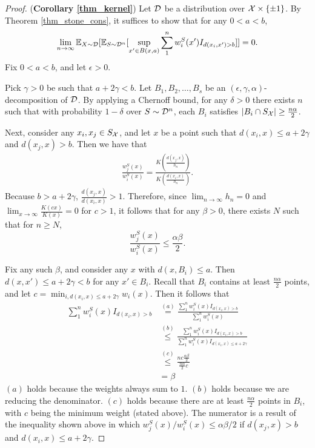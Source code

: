 \begin{proof} (\textbf{Corollary \ref{thm_kernel}})
Let ${\mathcal D}$ be a distribution over $\mathcal X \times \{\pm 1\}$. By Theorem \ref{thm_stone_cons}, it suffices to show that for any $0 < a < b$, $$\lim_{n \to \infty} \mathbb{E}_{X \sim {\mathcal D}}[\mathbb{E}_{S \sim {\mathcal D}^n} [\sup_{x' \in B(x,a)} \sum_1^n w_i^S(x')I_{d(x_i, x') > b}]] = 0.$$ Fix $0 < a < b$, and let $\epsilon > 0$. 

Pick $\gamma > 0$ be such that $a+ 2\gamma < b$. Let $B_1, B_2, \dots, B_s$ be an $(\epsilon, \gamma, \alpha)$-decomposition of ${\mathcal D}$. By applying a Chernoff bound, for any $\delta > 0$ there exists $n$ such that with probability $1-\delta$ over $S \sim {\mathcal D}^n$, each $B_i$ satisfies $|B_i \cap S_\mathcal X| \geq \frac{n\alpha}{2}$.

Next, consider any $x_i, x_j \in S_\mathcal X$, and let $x$ be a point such that $d(x_i, x) \leq a+2\gamma$ and $d(x_j, x) > b$. Then we have that 
\begin{equation*}
\begin{split}
\frac{w_j^S(x)}{w_i^S(x)} = \frac{K(\frac{d(x_j, x)}{h_n})}{K(\frac{d(x_i, x)}{h_n})}.
\end{split}
\end{equation*}
Because $b > a + 2\gamma$, $\frac{d(x_j, x)}{d(x_i, x)} > 1$. Therefore, since $\lim_{n \to \infty} h_n = 0$ and $\lim_{x \to \infty} \frac{K(cx)}{K(x)} = 0$ for $c > 1$, it follows that for any $\beta > 0$, there exists $N$ such that for $n \geq N$, $$\frac{w_j^S(x)}{w_i^S(x)} \leq \frac{\alpha\beta}{2}.$$ 

Fix any such $\beta$, and consider any $x$ with $d(x, B_i) \leq a$. Then $d(x, x') \leq a+ 2\gamma < b$ for any $x' \in B_i$. Recall that $B_i$ contains at least $\frac{n\alpha}{2}$ points, and let $c = \min_{i, d(x_i, x) \leq a + 2\gamma} w_i(x)$. Then it follows that 
\begin{equation*}
\begin{split}
\sum_1^n w_i^S(x)I_{d(x_i, x) > b} &\stackrel{(a)}{=} \frac{\sum_1^n w_i^S(x)I_{d(x_i, x) > b}}{\sum_1^n w_i^S(x)} \\
&\stackrel{(b)}{\leq} \frac{\sum_1^n w_i^S(x)I_{d(x_i, x) > b}}{\sum_1^n w_i^S(x)I_{d(x_i, x) \leq a+2\gamma}} \\
&\stackrel{(c)}{\leq} \frac{nc\frac{\alpha\beta}{2}}{\frac{n\alpha}{2}c} \\
&= \beta
\end{split}
\end{equation*} $(a)$ holds because the weights always sum to $1$. $(b)$ holds because we are reducing the denominator. $(c)$ holds because there are at least $\frac{n\alpha}{2}$ points in $B_i$, with $c$ being the minimum weight (stated above). The numerator is a result of the inequality shown above in which $w_j^S(x)/w_i^S(x) \leq \alpha\beta/2$ if $d(x_j, x) > b$ and $d(x_i, x) \leq a+2\gamma$.


\end{proof}
